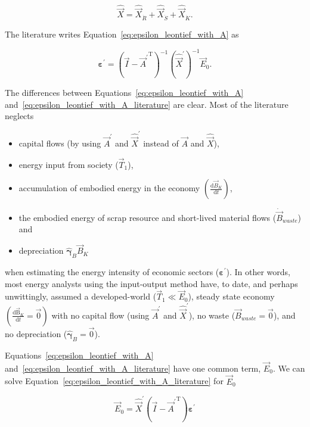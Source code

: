 \begin{equation}
	\hat{\vec{X}} = \hat{\vec{X}}_{\dot{R}} + \hat{\vec{X}}_{\dot{S}} + \hat{\vec{X}}_{\dot{K}}.
\end{equation}

The literature writes Equation~\ref{eq:epsilon_leontief_with_A} as

\begin{equation} \label{eq:epsilon_leontief_with_A_literature}
	\boldsymbol{\varepsilon^{'}} 
	= {\left( \vec{I} - {\vec{A}^{'}}^{\mathrm{T}} \right)}^{-1}
	{\left( \hat{\vec{X}}^{'} \right)}^{-1}
	\vec{E}_{0}.
\end{equation}

The differences between Equations~\ref{eq:epsilon_leontief_with_A}
and~\ref{eq:epsilon_leontief_with_A_literature} are clear. 
Most of the literature neglects
\begin{itemize}
	\item{capital flows (by using $\vec{A}^{'}$ and $\hat{\vec{X}}^{'}$
			instead of $\vec{A}$ and $\hat{\vec{X}}$),}
	\item{energy input from society ($\vec{T}_{1}$),}
	\item{accumulation of embodied energy in the economy 
			$\left( \frac{\mathrm{d}\vec{B}_{K}}{\mathrm{d}t} \right)$,}
	\item{the embodied energy of scrap resource	and short-lived material flows 
			($\dot{\vec{B}}_{waste}$) and}
	\item{depreciation $\hat{\boldsymbol{\gamma}}_{B} \vec{B}_{K}$}
\end{itemize}

\noindent{}when estimating the energy intensity  
of economic sectors ($\boldsymbol{\varepsilon}^{'}$).
In other words, most energy analysts using the input-output method
have, to date, and perhaps unwittingly, assumed 
a developed-world ($\vec{T}_{1} \ll \vec{E}_{0}$),
steady state economy
$\left( \frac{\mathrm{d}\mathrm{\vec{B}}_{K}}{\mathrm{d}t}  
= \vec{0} \right)$ 
with 
no capital flow (using $\vec{A}^{'}$ and $\hat{\vec{X}}^{'}$),
no waste ($\vec{B}_{waste} = \vec{0}$), and
no depreciation ($\hat{\boldsymbol{\gamma}}_{B} = \vec{0}$).

Equations~\ref{eq:epsilon_leontief_with_A} 
and~\ref{eq:epsilon_leontief_with_A_literature}
have one common term, $\vec{E}_{0}$.
We can solve Equation~\ref{eq:epsilon_leontief_with_A_literature}
for $\vec{E}_{0}$ 

\begin{equation}
	\vec{E}_{0}
	= \hat{\vec{X}}^{'} \left( \vec{I} - {\vec{A}^{'}}^\mathrm{T} \right) \boldsymbol{\varepsilon^{'}} 
\end{equation}

